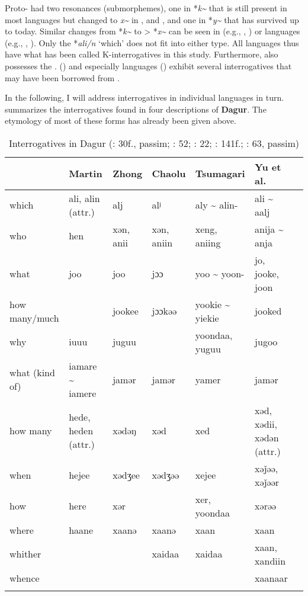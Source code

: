 Proto- had two resonances (submorphemes), one in *\textit{k{\textasciitilde}} that is still present in most  languages but changed to \textit{x{\textasciitilde}} in ,  and , and one in *\textit{y{\textasciitilde}} that has survived up to today. Similar changes from *\textit{k{\textasciitilde}} to > *\textit{x{\textasciitilde}} can be seen in  (e.g., , ) or  languages (e.g., , ). Only the  *\textit{ali/n} ‘which’ does not fit into either type. All  languages thus have what has been called K-interrogatives in this study. Furthermore,  also possesses the .  () and especially  languages () exhibit several interrogatives that may have been borrowed from .

In the following, I will address interrogatives in individual  languages in turn.  summarizes the interrogatives found in four descriptions of \textbf{Dagur}. The etymology of most of these forms has already been given above.

\begin{table}
\caption{Interrogatives in Dagur (\citealt{Martin1961}: 30f., passim; \citealt{ZhongSuchun1982}: 52; \citealt{Chaolu1996}: 22; \citealt{Tsumagari2003}: 141f.; \citealt{Yu2008}: 63, passim)}
\label{tab:mong:17}

\begin{tabularx}{\textwidth}{lQllQQQ}
\lsptoprule
& \textbf{Martin} & \textbf{Zhong} & \textbf{Chaolu} & \textbf{Tsumagari} & \textbf{Yu et al.}\\
\midrule
which & ali, alin (attr.) & alj & alʲ & aly {\textasciitilde} alin- & ali {\textasciitilde} aalj\\
who & hen & xən, anii & xən, aniin & xeng, aniing & anija {\textasciitilde} anja\\
what & joo & joo & jɔɔ & yoo {\textasciitilde} yoon- & jo, jooke, joon\\
how many/much &  & jookee & jɔɔkəə & yookie {\textasciitilde} yiekie & jooked\\
why & iuuu & juguu &  & yoondaa, yuguu & jugoo\\
what (kind of) & iamare {\textasciitilde} iamere & jamər & jamər & yamer & jamər\\
how many & hede, heden (attr.) & xədəŋ & xəd & xed & xəd, xədii, xədən (attr.)\\
when & hejee & xədʒee & xədʒəə & xejee & xəǰəə, xəǰəər\\
how & here & xər &  & xer, yoondaa & xərəə\\
where & haane & xaanə & xaanə & xaan & xaan\\
whither &  &  & xaidaa & xaidaa & xaan, xandiin\\
whence &  &  &  &  & xaanaar\\
\lspbottomrule
\end{tabularx}
\end{table}

